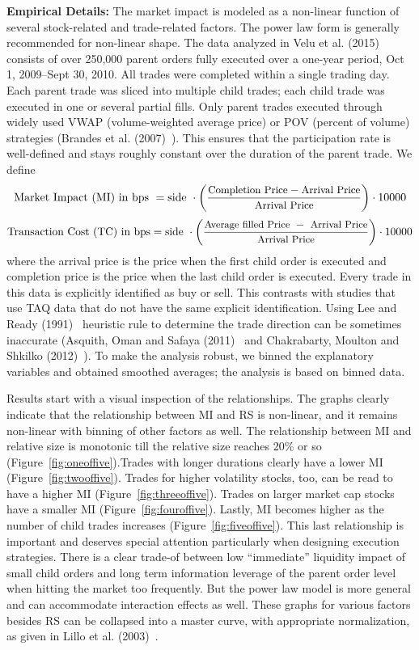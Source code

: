 \noindent\textbf{Empirical Details: } The market impact is modeled as a non-linear function of several stock-related and trade-related factors. The power law form is generally recommended for non-linear shape. The data analyzed in Velu et al. (2015)~\cite{unpub} consists of over 250,000 parent orders fully executed over a one-year period, Oct 1, 2009--Sept 30, 2010. All trades were completed within a single trading day. Each parent trade was sliced into multiple child trades; each child trade was executed in one or several partial fills. Only parent trades executed through widely used VWAP (volume-weighted average price) or POV (percent of volume) strategies (Brandes et al. (2007)~\cite{brandes2007}). This ensures that the participation rate is well-defined and stays roughly constant over the duration of the parent trade. We define 
	\small
	\[
	\text{Market Impact (MI) in bps }= \text{side } \cdot \left(\dfrac{\text{\small Completion Price} - \text{\small Arrival Price}}{\text{\small Arrival Price}}\right) \cdot 10000
	\]
	\[
	\text{Transaction Cost (TC) in bps}= \text{side } \cdot \left(\dfrac{\text{\small Average filled Price }-\text{ \small Arrival Price}}{\text{\small Arrival Price}} \right) \cdot 10000
	\]
\noindent \normalsize where the arrival price is the price when the first child order is executed and completion price is the price when the last child order is executed. Every trade in this data is explicitly identified as buy or sell. This contrasts with studies that use TAQ data that do not have the same explicit identification. Using Lee and Ready (1991)~\cite{leeready} heuristic rule to determine the trade direction can be sometimes inaccurate (Asquith, Oman and Safaya (2011)~\cite{asquith2010} and Chakrabarty, Moulton and Shkilko (2012)~\cite{chakrabarty2012short}). To make the analysis robust, we binned the explanatory variables and obtained smoothed averages; the analysis is based on binned data.


Results start with a visual inspection of the relationships. The graphs clearly indicate that the relationship between MI and RS is non-linear, and it remains non-linear with binning of other factors as well. The relationship between MI and relative size is monotonic till the relative size reaches 20\% or so (Figure~\ref{fig:oneoffive}).Trades with longer durations clearly have a lower MI (Figure~\ref{fig:twooffive}). Trades for higher volatility stocks, too, can be read to have a higher MI (Figure~\ref{fig:threeoffive}). Trades on larger market cap stocks have a smaller MI (Figure~\ref{fig:fouroffive}). Lastly, MI becomes higher as the number of child trades increases (Figure~\ref{fig:fiveoffive}). This last relationship is important and deserves special attention particularly when designing execution strategies. There is a clear trade-of between low ``immediate'' liquidity impact of small child orders and long term information leverage of the parent order level when hitting the market too frequently. But the power law model is more general and can accommodate interaction effects as well. These graphs for various factors besides RS can be collapsed into a master curve, with appropriate normalization, as given in Lillo et al. (2003)~\cite{farmermantegna}.
	
